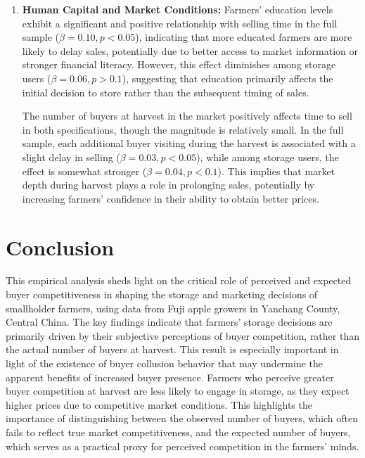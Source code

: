 \begin{enumerate}
    \item \textbf{Human Capital and Market Conditions:} Farmers' education levels exhibit a significant and positive relationship with selling time in the full sample ($\beta = 0.10, p<0.05$), indicating that more educated farmers are more likely to delay sales, potentially due to better access to market information or stronger financial literacy. However, this effect diminishes among storage users ($\beta = 0.06, p>0.1$), suggesting that education primarily affects the initial decision to store rather than the subsequent timing of sales.
    
    The number of buyers at harvest in the market positively affects time to sell in both specifications, though the magnitude is relatively small. In the full sample, each additional buyer visiting during the harvest is associated with a slight delay in selling ($\beta = 0.03, p<0.05$), while among storage users, the effect is somewhat stronger ($\beta = 0.04, p<0.1$). This implies that market depth during harvest plays a role in prolonging sales, potentially by increasing farmers' confidence in their ability to obtain better prices.
\end{enumerate}


\section{Conclusion}
\noindent This empirical analysis sheds light on the critical role of perceived and expected buyer competitiveness in shaping the storage and marketing decisions of smallholder farmers, using data from Fuji apple growers in Yanchang County, Central China. The key findings indicate that farmers' storage decisions are primarily driven by their subjective perceptions of buyer competition, rather than the actual number of buyers at harvest. This result is especially important in light of the existence of buyer collusion behavior that may undermine the apparent benefits of increased buyer presence. Farmers who perceive greater buyer competition at harvest are less likely to engage in storage, as they expect higher prices due to competitive market conditions. This highlights the importance of distinguishing between the observed number of buyers, which often fails to reflect true market competitiveness, and the expected number of buyers, which serves as a practical proxy for perceived competition in the farmers' minds.

